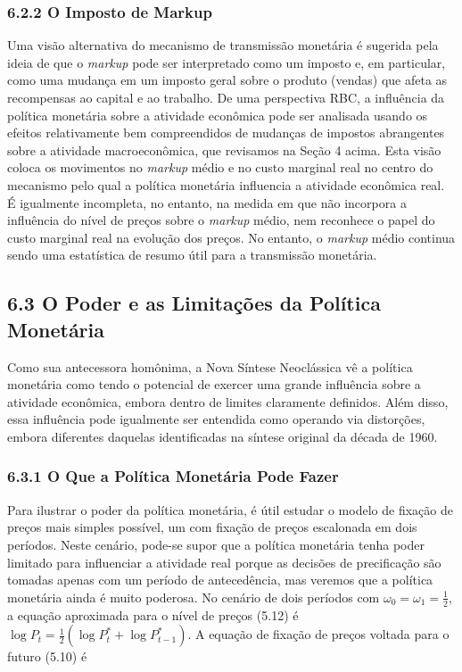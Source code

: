 \documentclass[12pt]{article}
\begin{document}
\subsubsection{6.2.2 O Imposto de Markup} Uma visão alternativa do mecanismo de transmissão monetária é sugerida pela ideia de que o \textit{markup} pode ser interpretado como um imposto e, em particular, como uma mudança em um imposto geral sobre o produto (vendas) que afeta as recompensas ao capital e ao trabalho. De uma perspectiva RBC, a influência da política monetária sobre a atividade econômica pode ser analisada usando os efeitos relativamente bem compreendidos de mudanças de impostos abrangentes sobre a atividade macroeconômica, que revisamos na Seção 4 acima. Esta visão coloca os movimentos no \textit{markup} médio e no custo marginal real no centro do mecanismo pelo qual a política monetária influencia a atividade econômica real. É igualmente incompleta, no entanto, na medida em que não incorpora a influência do nível de preços sobre o \textit{markup} médio, nem reconhece o papel do custo marginal real na evolução dos preços. No entanto, o \textit{markup} médio continua sendo uma estatística de resumo útil para a transmissão monetária.

\subsection{6.3 O Poder e as Limitações da Política Monetária}

Como sua antecessora homônima, a Nova Síntese Neoclássica vê a política monetária como tendo o potencial de exercer uma grande influência sobre a atividade econômica, embora dentro de limites claramente definidos. Além disso, essa influência pode igualmente ser entendida como operando via distorções, embora diferentes daquelas identificadas na síntese original da década de 1960.

\subsubsection{6.3.1 O Que a Política Monetária Pode Fazer} Para ilustrar o poder da política monetária, é útil estudar o modelo de fixação de preços mais simples possível, um com fixação de preços escalonada em dois períodos. Neste cenário, pode-se supor que a política monetária tenha poder limitado para influenciar a atividade real porque as decisões de precificação são tomadas apenas com um período de antecedência, mas veremos que a política monetária ainda é muito poderosa. No cenário de dois períodos com $\omega_0 = \omega_1 = \frac{1}{2}$, a equação aproximada para o nível de preços (5.12) é $\log P_t = \frac{1}{2}(\log P_t^* + \log P_{t-1}^*)$. A equação de fixação de preços voltada para o futuro (5.10) é
\end{document}
